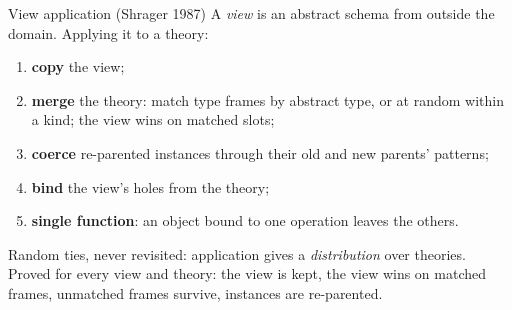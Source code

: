 \documentclass[aspectratio=169,11pt]{beamer}
\begin{document}
\begin{frame}{View application (Shrager 1987)}
  A \emph{view} is an abstract schema from outside the domain. Applying it to a theory:
  \begin{enumerate}
    \item \textbf{copy} the view;
    \item \textbf{merge} the theory: match type frames by abstract type, or at random within a kind; the view wins on matched slots;
    \item \textbf{coerce} re-parented instances through their old and new parents' patterns;
    \item \textbf{bind} the view's holes from the theory;
    \item \textbf{single function}: an object bound to one operation leaves the others.
  \end{enumerate}
  \medskip
  Random ties, never revisited: application gives a \emph{distribution} over theories. Proved for every view and theory: the view is kept, the view wins on matched frames, unmatched frames survive, instances are re-parented.
\end{frame}
\end{document}
